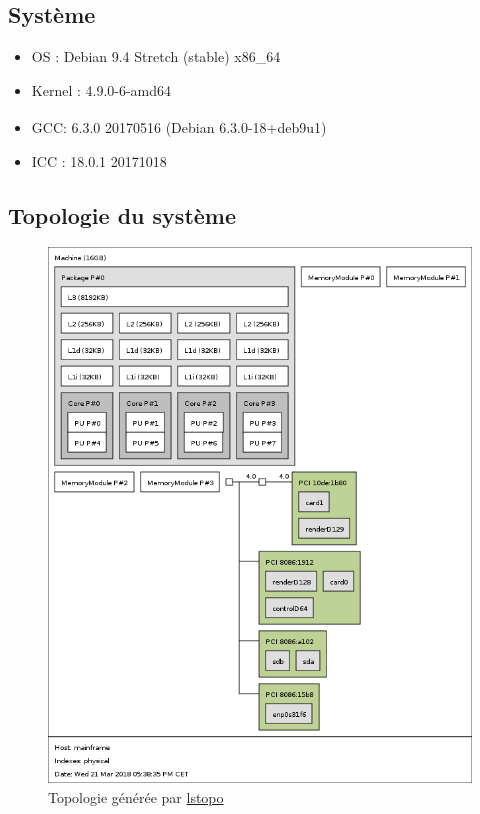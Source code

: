 \documentclass{report}
\begin{document}
    \subsection{Système}
      \begin{itemize}
      \item OS : Debian 9.4 Stretch (stable) x86\_64
      \item Kernel :  4.9.0-6-amd64
      \item GCC\textsuperscript \textcopyleft   : 6.3.0 20170516 (Debian 6.3.0-18+deb9u1)
      \item ICC : 18.0.1 20171018
    \end{itemize}
  \subsection{Topologie du système}
    \begin{figure}[ht!]
      \centering
      \includegraphics[scale=0.35]{resources/lstopo.png}
      \caption{Topologie générée par \href{https://manpages.debian.org/jessie/hwloc/lstopo.1.en.html}{lstopo}}
    \end{figure}
  \newpage
\end{document}
